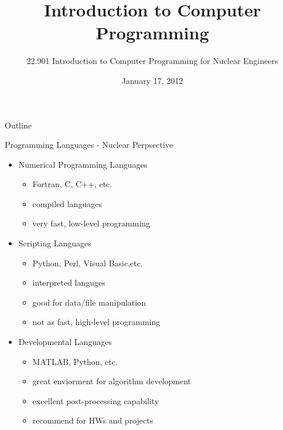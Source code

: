 \documentclass{beamer}
\title[Introduction to Computer Programming]{Introduction to Computer Programming}
\author[]{22.901 Introduction to Computer Programming for Nuclear Engineers}
\institute[\insertpagenumber]{}
\date{January 17, 2012}
\begin{document}

\frame{\titlepage}

\begin{frame}{Outline}
  \tableofcontents{}
\end{frame}
\begin{frame}{Programming Languages - Nuclear Perpsective}
\begin{itemize}

  \item Numerical Programming Languages
  \begin{itemize}
      \item Fortran, C, C++, etc.
      \item compiled languages
      \item very fast, low-level programming
  \end{itemize}

  \item Scripting Languages
    \begin{itemize}
      \item Python, Perl, Visual Basic,etc.
      \item interpreted languges
      \item good for data/file manipulation
      \item not as fast, high-level programming
    \end{itemize}

  \item Developmental Languages
    \begin{itemize}
      \item MATLAB, Python, etc.
      \item great enviorment for algorithm development
      \item excellent post-processing capability
      \item recommend for HWs and projects
    \end{itemize}

\end{itemize}
\end{frame}
\end{document}
